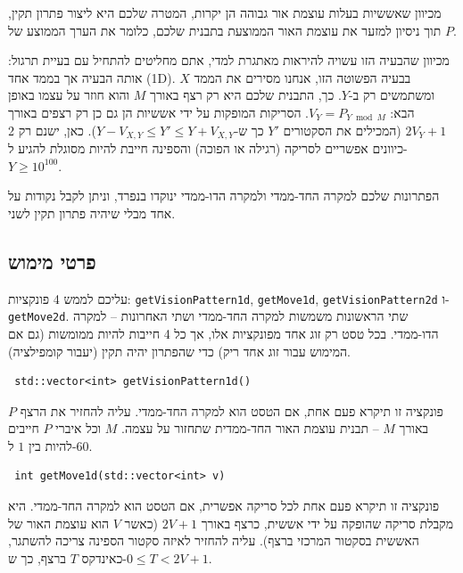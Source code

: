 \documentclass[12pt]{article}
\begin{document}
מכיוון שאששיות בעלות עוצמת אור גבוהה הן יקרות, המטרה שלכם היא ליצור פתרון תקין, תוך ניסיון למזער את עוצמת האור הממוצעת בתבנית שלכם, כלומר את הערך הממוצע של $P$.

מכיוון שהבעיה הזו עשויה להיראות מאתגרת למדי, אתם מחליטים להתחיל עם בעיית תרגול: אותה הבעיה אך בממד אחד (1D). בבעיה הפשוטה הזו, אנחנו מסירים את הממד $X$ ומשתמשים רק ב-$Y$. כך, התבנית שלכם היא רק רצף באורך $M$ והוא חוזר על עצמו באופן הבא: $V_Y = P_{Y \bmod M}$. הסריקות המופקות על ידי אששיות הן גם כן רק רצפים באורך $2V_Y + 1$ (המכילים את הסקטורים $Y'$ כך ש-$Y - V_{X, Y} \leq Y' \leq Y + V_{X, Y}$). כאן, ישנם רק 2 כיוונים אפשריים לסריקה (רגילה או הפוכה) והספינה חייבת להיות מסוגלת להגיע ל-$Y \geq 10^{100}$.

הפתרונות שלכם למקרה החד-ממדי ולמקרה הדו-ממדי ינוקדו בנפרד, וניתן לקבל נקודות על אחד מבלי שיהיה פתרון תקין לשני.

\subsection{פרטי מימוש}

עליכם לממש 4 פונקציות: \foreignlanguage{english}{\texttt{getVisionPattern1d}}, \foreignlanguage{english}{\texttt{getMove1d}}, \foreignlanguage{english}{\texttt{getVisionPattern2d}} ו-\foreignlanguage{english}{\texttt{getMove2d}}. שתי הראשונות משמשות למקרה החד-ממדי ושתי האחרונות -- למקרה הדו-ממדי. בכל  טסט רק זוג אחד מפונקציות אלו, אך כל 4 חייבות להיות ממומשות (גם אם המימוש עבור זוג אחד ריק) כדי שהפתרון יהיה תקין (יעבור קומפילציה).

\begin{otherlanguage}{english}
\begin{lstlisting}
 std::vector<int> getVisionPattern1d()
\end{lstlisting}
\end{otherlanguage}{}

פונקציה זו תיקרא פעם אחת, אם הטסט הוא למקרה החד-ממדי. עליה להחזיר את הרצף $P$ באורך $M$ -- תבנית עוצמת האור החד-ממדית שתחזור על עצמה. $M$ וכל איברי $P$ חייבים להיות בין $1$ ל-$60$.

\begin{otherlanguage}{english}
\begin{lstlisting}
 int getMove1d(std::vector<int> v)
\end{lstlisting}
\end{otherlanguage}{}

פונקציה זו תיקרא פעם אחת לכל סריקה אפשרית, אם הטסט הוא למקרה החד-ממדי. היא מקבלת סריקה שהופקה על ידי אששית, כרצף באורך $2V + 1$ (כאשר $V$ הוא עוצמת האור של האששית בסקטור המרכזי ברצף). עליה להחזיר לאיזה סקטור הספינה צריכה להשתגר, כאינדקס $T$ ברצף, כך ש-$0 \leq T < 2V + 1$.
\end{document}
